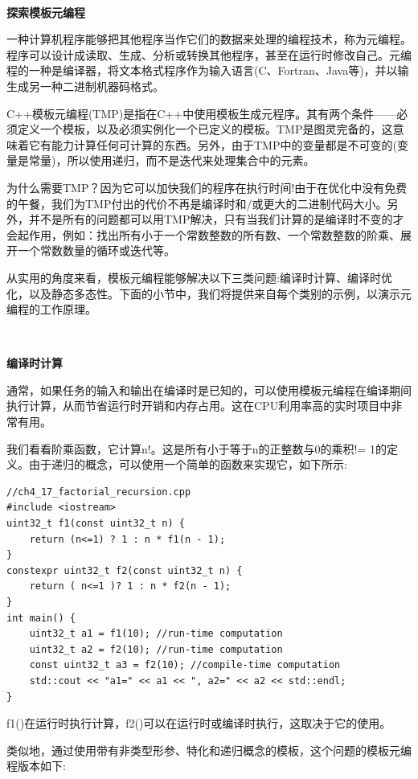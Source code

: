 \noindent\textbf{}\ \par
\textbf{探索模板元编程} \ \par
一种计算机程序能够把其他程序当作它们的数据来处理的编程技术，称为元编程。程序可以设计成读取、生成、分析或转换其他程序，甚至在运行时修改自己。元编程的一种是编译器，将文本格式程序作为输入语言(C、Fortran、Java等)，并以输生成另一种二进制机器码格式。\par
C++模板元编程(TMP)是指在C++中使用模板生成元程序。其有两个条件——必须定义一个模板，以及必须实例化一个已定义的模板。TMP是图灵完备的，这意味着它有能力计算任何可计算的东西。另外，由于TMP中的变量都是不可变的(变量是常量)，所以使用递归，而不是迭代来处理集合中的元素。 \par
为什么需要TMP？因为它可以加快我们的程序在执行时间!由于在优化中没有免费的午餐，我们为TMP付出的代价不再是编译时和/或更大的二进制代码大小。另外，并不是所有的问题都可以用TMP解决，只有当我们计算的是编译时不变的才会起作用，例如：找出所有小于一个常数整数的所有数、一个常数整数的阶乘、展开一个常数数量的循环或迭代等。 \par
从实用的角度来看，模板元编程能够解决以下三类问题:编译时计算、编译时优化，以及静态多态性。下面的小节中，我们将提供来自每个类别的示例，以演示元编程的工作原理。 \par

\noindent\textbf{}\ \par
\textbf{编译时计算} \ \par
通常，如果任务的输入和输出在编译时是已知的，可以使用模板元编程在编译期间执行计算，从而节省运行时开销和内存占用。这在CPU利用率高的实时项目中非常有用。 \par
我们看看阶乘函数，它计算n!。这是所有小于等于n的正整数与0的乘积!= 1的定义。由于递归的概念，可以使用一个简单的函数来实现它，如下所示: \par

\begin{lstlisting}[caption={}]
//ch4_17_factorial_recursion.cpp
#include <iostream>
uint32_t f1(const uint32_t n) {
	return (n<=1) ? 1 : n * f1(n - 1);
}
constexpr uint32_t f2(const uint32_t n) {
	return ( n<=1 )? 1 : n * f2(n - 1);
}
int main() {
	uint32_t a1 = f1(10); //run-time computation
	uint32_t a2 = f2(10); //run-time computation
	const uint32_t a3 = f2(10); //compile-time computation
	std::cout << "a1=" << a1 << ", a2=" << a2 << std::endl;
}
\end{lstlisting}

f1()在运行时执行计算，f2()可以在运行时或编译时执行，这取决于它的使用。 \par
类似地，通过使用带有非类型形参、特化和递归概念的模板，这个问题的模板元编程版本如下:\par

